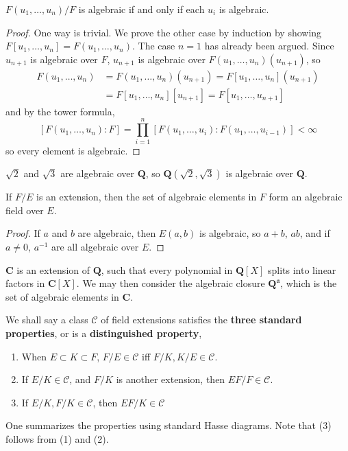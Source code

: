 \begin{theorem}
    $F(u_1, \dots, u_n)/F$ is algebraic if and only if each $u_i$ is algebraic.
\end{theorem}
\begin{proof}
    One way is trivial. We prove the other case by induction by showing $F[u_1, \dots, u_n] = F(u_1, \dots, u_n)$. The case $n = 1$ has already been argued. Since $u_{n+1}$ is algebraic over $F$, $u_{n+1}$ is algebraic over $F(u_1, \dots, u_n)(u_{n+1})$, so
    \begin{align*}
        F(u_1, \dots, u_n) &= F(u_1, \dots, u_n)(u_{n+1}) = F[u_1, \dots, u_n](u_{n+1})\\
        &= F[u_1, \dots, u_n][u_{n+1}] = F[u_1, \dots, u_{n+1}]
    \end{align*}
    and by the tower formula,
    \[ [F(u_1, \dots, u_n): F] = \prod_{i = 1}^n [F(u_1, \dots, u_i) : F(u_1, \dots, u_{i-1})] < \infty \]
    so every element is algebraic.
\end{proof}

\begin{example}
    $\sqrt{2}$ and $\sqrt{3}$ are algebraic over $\mathbf{Q}$, so $\mathbf{Q}(\sqrt{2}, \sqrt{3})$ is algebraic over $\mathbf{Q}$.
\end{example}

\begin{theorem}
    If $F/E$ is an extension, then the set of algebraic elements in $F$ form an algebraic field over $E$.
\end{theorem}
\begin{proof}
    If $a$ and $b$ are algebraic, then $E(a,b)$ is algebraic, so $a + b$, $ab$, and if $a \neq 0$, $a^{-1}$ are all algebraic over $E$.
\end{proof}

\begin{example}
    $\mathbf{C}$ is an extension of $\mathbf{Q}$, such that every polynomial in $\mathbf{Q}[X]$ splits into linear factors in $\mathbf{C}[X]$. We may then consider the algebraic closure $\mathbf{Q}^{\mathfrak{a}}$, which is the set of algebraic elements in $\mathbf{C}$.
\end{example}

We shall say a class $\mathcal{C}$ of field extensions satisfies the {\bf three standard properties}, or is a {\bf distinguished property},
%
\begin{enumerate}
    \item When $E \subset K \subset F$, $F/E \in \mathcal{C}$ iff $F/K,K/E \in \mathcal{C}$.
    \item If $E/K \in \mathcal{C}$, and $F/K$ is another extension, then $EF/F \in \mathcal{C}$.
    \item If $E/K, F/K \in \mathcal{C}$, then $EF/K \in \mathcal{C}$
\end{enumerate}
%
One summarizes the properties using standard Hasse diagrams. Note that (3) follows from (1) and (2).

